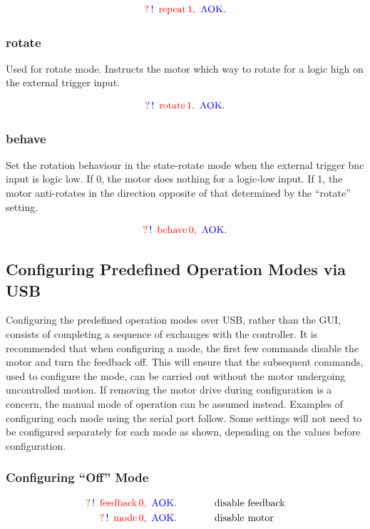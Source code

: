 \documentclass[10pt]{article}
\newcommand{\comm}[3]{
\nonumber \textcolor{red}{?} \, \textcolor{blue}{!} \, \textcolor{red}{\text{ #1}} \,\textcolor{red}{\text{#2, }} \, \textcolor{blue}{\text{AOK.}} \, & \text{\hspace{0.5in}#3}}
\newcommand{\exchange}[2]{
\begin{equation}
 \nonumber \textcolor{red}{?} \, \textcolor{blue}{!} \, \textcolor{red}{\text { #1}} \,\textcolor{red}{\text{#2, }} \, \textcolor{blue}{\text{AOK.}}
 \end{equation}
}
\begin{document}
\exchange{repeat}{1}

\subsubsection{rotate}
\label{rotate}
Used for rotate mode.  Instructs the motor which way to rotate for a logic high on the external trigger input.   

\exchange{rotate}{1}

\subsubsection{behave}
\label{behave}
Set the rotation behaviour in the state-rotate mode when the external trigger bnc input is logic low.  If 0, the motor does nothing for a logic-low input.  If 1, the motor anti-rotates in the direction opposite of that determined by the ``rotate'' setting. 

\exchange{behave}{0} 


\subsection{Configuring Predefined Operation Modes via USB}
\label{Configuring_Predefined_Operation_Modes}
Configuring the predefined operation modes over USB, rather than the GUI, consists of completing a sequence of exchanges with the controller.  It is recommended that when configuring a mode, the first few commands disable the motor and turn the feedback off.  This will ensure that the subsequent commands, used to configure the mode, can be carried out without the motor undergoing uncontrolled motion.  If removing the motor drive during configuration is a concern, the manual mode of operation can be assumed instead.  Examples of configuring each mode using the serial port follow.  Some settings will not need to be configured separately for each mode as shown, depending on the values before configuration.    

\subsubsection{Configuring ``Off'' Mode}
\begin{align}
\comm{feedback}{0}{disable feedback} \\
\comm{mode}{0}{disable motor} \\
\nonumber
\end{align}
\end{document}
